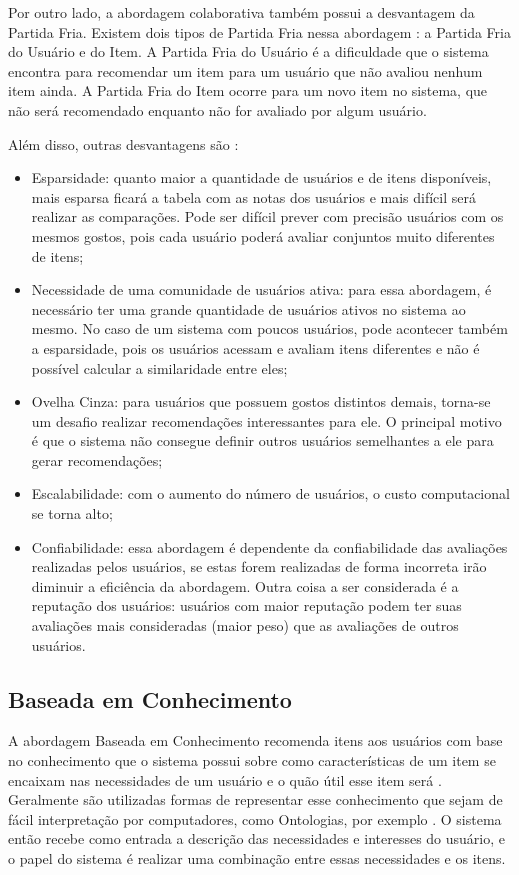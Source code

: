 Por outro lado, a abordagem colaborativa também possui a desvantagem da Partida Fria. Existem dois tipos de Partida Fria
nessa abordagem \cite{adomavicius2005toward}: a Partida Fria do Usuário e do Item. A Partida Fria do Usuário é a dificuldade
que o sistema encontra para recomendar um item para um usuário que não avaliou nenhum item ainda. A Partida Fria do Item
ocorre para um novo item no sistema, que não será recomendado enquanto não for avaliado por algum usuário.

Além disso, outras desvantagens são \cite{adomavicius2005toward}:

\begin{itemize}
\item Esparsidade: quanto maior a quantidade de usuários e de itens disponíveis, mais esparsa ficará a tabela com as
notas dos usuários e mais difícil será realizar as comparações. Pode ser difícil prever com precisão usuários com os
mesmos gostos, pois cada usuário poderá avaliar conjuntos muito diferentes de itens;
\item Necessidade de uma comunidade de usuários ativa: para essa abordagem, é necessário ter uma grande quantidade de
usuários ativos no sistema ao mesmo. No caso de um sistema com poucos usuários, pode acontecer também a esparsidade,
pois os usuários acessam e avaliam itens diferentes e não é possível calcular a similaridade entre eles;
\item Ovelha Cinza: para usuários que possuem gostos distintos demais, torna-se um desafio realizar recomendações
interessantes para ele. O principal motivo é que o sistema não consegue definir outros usuários semelhantes a ele para
gerar recomendações;
\item Escalabilidade: com o aumento do número de usuários, o custo computacional se torna alto;
\item Confiabilidade: essa abordagem é dependente da confiabilidade das avaliações realizadas pelos usuários, se estas forem
realizadas de forma incorreta irão diminuir a eficiência da abordagem. Outra coisa a ser considerada é a reputação dos
usuários: usuários com maior reputação podem ter suas avaliações mais consideradas (maior peso) que as avaliações de
outros usuários.
\end{itemize}

\subsection{Baseada em Conhecimento}

A abordagem Baseada em Conhecimento recomenda itens aos usuários com base no conhecimento que o sistema possui sobre
como características de um item se encaixam nas necessidades de um usuário e o quão útil esse item será
\cite{ricci2011introduction}. Geralmente são utilizadas formas de representar esse conhecimento que sejam de fácil interpretação
por computadores, como Ontologias, por exemplo \cite{burke2002hybrid}. O sistema então recebe como entrada a descrição das
necessidades e interesses do usuário, e o papel do sistema é realizar uma combinação entre essas necessidades e os itens.

